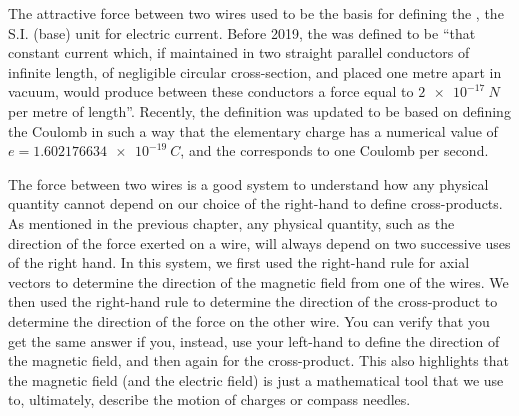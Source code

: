 The attractive force between two wires used to be the basis for defining the \ampere, the S.I. (base) unit for electric current. Before 2019, the \amperesp was defined to be ``that constant current which, if maintained in two straight parallel conductors of infinite length, of negligible circular cross-section, and placed one metre apart in vacuum, would produce between these conductors a force equal to $\SI{2e-17}{N}$ per metre of length''. Recently, the definition was updated to be based on defining the Coulomb in such a way that the elementary charge has a numerical value of $e=\SI{1.602176634e-19}{C}$, and the \amperesp corresponds to one Coulomb per second.

The force between two wires is a good system to understand how any physical quantity cannot depend on our choice of the right-hand to define cross-products. As mentioned in the previous chapter, any physical quantity, such as the direction of the force exerted on a wire, will always depend on two successive uses of the right hand. In this system, we first used the right-hand rule for axial vectors to determine the direction of the magnetic field from one of the wires. We then used the right-hand rule to determine the direction of the cross-product to determine the direction of the force on the other wire. You can verify that you get the same answer if you, instead, use your left-hand to define the direction of the magnetic field, and then again for the cross-product. This also highlights that the magnetic field (and the electric field) is just a mathematical tool that we use to, ultimately, describe the motion of charges or compass needles.



